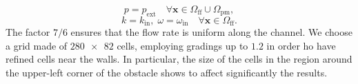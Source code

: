 \begin{equation}
	p = p_\text{ext} \quad \forall \mathbf{x} \in \Omega_\text{ff} \cup \Omega_\text{pm},
\end{equation}
\begin{equation}
	k = k_\text{in}, \; \omega = \omega_\text{in} \quad \forall \mathbf{x} \in \Omega_\text{ff}.
\end{equation}
The factor $7/6$ ensures that the flow rate is uniform along the channel.
We choose a grid made of $\num{280x82}$ cells, employing gradings up to $1.2$ in order ho have refined cells near the walls. In particular, the size of the cells in the region around the upper-left corner of the obstacle shows to affect significantly the results. 